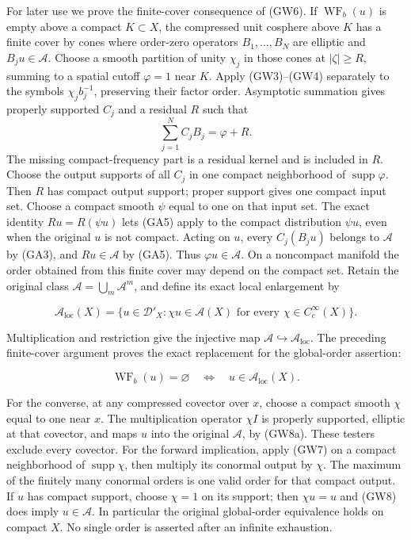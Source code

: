 \documentclass[
  11pt,
]{article}
\begin{document}
For later use we prove the finite-cover consequence of (GW6). If
\(\operatorname{WF}_b(u)\) is empty above a compact \(K\subset X\), the
compressed unit cosphere above \(K\) has a finite cover by cones where
order-zero operators \(B_1,\ldots,B_N\) are elliptic and
\(B_ju\in\mathcal A\). Choose a smooth partition of unity \(\chi_j\) in
those cones at \(|\zeta|\ge R\), summing to a spatial cutoff
\(\varphi=1\) near \(K\). Apply (GW3)--(GW4) separately to the symbols
\(\chi_j b_j^{-1}\), preserving their factor order. Asymptotic summation
gives properly supported \(C_j\) and a residual \(R\) such that \[
 \sum_{j=1}^N C_jB_j=\varphi+R.
 \tag{GW7}
\] The missing compact-frequency part is a residual kernel and is
included in \(R\). Choose the output supports of all \(C_j\) in one
compact neighborhood of \(\operatorname{supp}\varphi\). Then \(R\) has
compact output support; proper support gives one compact input set.
Choose a compact smooth \(\psi\) equal to one on that input set. The
exact identity \(Ru=R(\psi u)\) lets (GA5) apply to the compact
distribution \(\psi u\), even when the original \(u\) is not compact.
Acting on \(u\), every \(C_j(B_ju)\) belongs to \(\mathcal A\) by (GA3),
and \(Ru\in\mathcal A\) by (GA5). Thus \(\varphi u\in\mathcal A\). On a
noncompact manifold the order obtained from this finite cover may depend
on the compact set. Retain the original class
\(\mathcal A=\bigcup_m\mathcal A^m\), and define its exact local
enlargement by

\[
 \mathcal A_{\mathrm{loc}}(X)
 =\{u\in\mathcal D'_X:
       \chi u\in\mathcal A(X)\text{ for every }\chi\in C_c^\infty(X)\}.
 \tag{GW8a}
\]

Multiplication and restriction give the injective map
\(\mathcal A\hookrightarrow\mathcal A_{\mathrm{loc}}\). The preceding
finite-cover argument proves the exact replacement for the global-order
assertion:

\[
 \operatorname{WF}_b(u)=\varnothing
       \quad\Longleftrightarrow\quad u\in\mathcal A_{\mathrm{loc}}(X).
 \tag{GW8}
\]

For the converse, at any compressed covector over \(x\), choose a
compact smooth \(\chi\) equal to one near \(x\). The multiplication
operator \(\chi I\) is properly supported, elliptic at that covector,
and maps \(u\) into the original \(\mathcal A\), by (GW8a). These
testers exclude every covector. For the forward implication, apply (GW7)
on a compact neighborhood of \(\operatorname{supp}\chi\), then multiply
its conormal output by \(\chi\). The maximum of the finitely many
conormal orders is one valid order for that compact output. If \(u\) has
compact support, choose \(\chi=1\) on its support; then \(\chi u=u\) and
(GW8) does imply \(u\in\mathcal A\). In particular the original
global-order equivalence holds on compact \(X\). No single order is
asserted after an infinite exhaustion.
\end{document}
